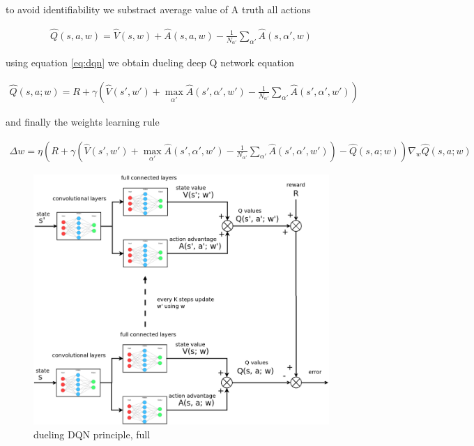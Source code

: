 \documentclass[10pt,a4paper]{article}
\begin{document}
to avoid identifiability we substract average value of A truth all actions

\begin{align}
  \hat{Q}(s, a, w) = \hat{V}(s, w) + \hat{A}(s, a, w) - \frac{1}{N_{\alpha'}} \sum_{\alpha'} \hat{A}(s, \alpha', w)
\end{align}

using equation \ref{eq:dqn} we obtain dueling deep Q network equation

\begin{align}
  \hat{Q}(s, a; w) = R + \gamma \left( \hat{V}(s', w') + \max \limits_{\alpha'} \hat{A}(s', \alpha', w') - \frac{1}{N_{\alpha'}} \sum_{\alpha'} \hat{A}(s', \alpha', w') \right)
  \label{eq:ddqn}
\end{align}

and finally the weights learning rule

\begin{align}
  \Delta w = \eta \left( R + \gamma \left( \hat{V}(s', w') + \max \limits_{\alpha'} \hat{A}(s', \alpha', w') - \frac{1}{N_{\alpha'}} \sum_{\alpha'} \hat{A}(s', \alpha', w') \right) - \hat{Q}(s, a; w)\right) \nabla_w \hat{Q}(s, a; w)
  \label{eq:ddqn_w_update}
\end{align}


\begin{figure}[!htb]
  \centering
  \includegraphics[scale=0.3]{../../diagrams/dueling_dqn_1.png}
  \caption{dueling DQN principle, full}
  \label{img:ddqn_full}
\end{figure}
\end{document}
